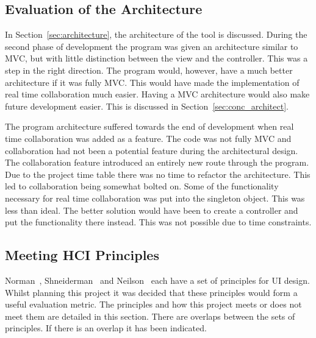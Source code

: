 \subsection{Evaluation of the Architecture}

In Section~\ref{sec:architecture}, the architecture of the tool is discussed.  During the second phase of development the program was given an architecture similar to \ac{MVC}, but with little distinction between the view and the controller.  This was a step in the right direction.  The program would, however, have a much better architecture if it was fully \ac{MVC}.  This would have made the implementation of real time collaboration much easier. Having a \ac{MVC} architecture would also make future development easier.  This is discussed in Section~\ref{sec:conc_architect}.

The program architecture suffered towards the end of development when real time collaboration was added as a feature.  The code was not fully \ac{MVC} and collaboration had not been a potential feature during the architectural design.  The collaboration feature introduced an entirely new route through the program.  Due to the project time table there was no time to refactor the architecture.  This led to collaboration being somewhat bolted on.  Some of the functionality necessary for real time collaboration was put into the singleton object.  This was less than ideal.  The better solution would have been to create a controller and put the functionality there instead.  This was not possible due to time constraints.

\subsection{Meeting HCI Principles}
\label{sec:principles}

Norman~\cite{normsev}, Shneiderman~\cite{shgold} and Neilson~\cite{neilten} each have a set of principles for \ac{UI} design.  Whilst planning this project it was decided that these principles would form a useful evaluation metric.  The principles and how this project meets or does not meet them are detailed in this section.  There are overlaps between the sets of principles.  If there is an overlap it has been indicated.


